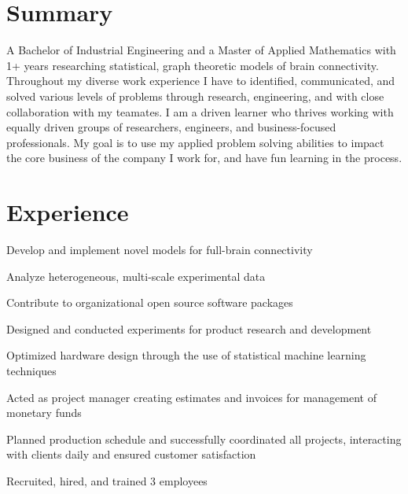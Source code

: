 \documentclass[]{deedy-resume-openfont}
\begin{document}
\hfill
\begin{minipage}[t]{0.63\textwidth}

\section{Summary}
A Bachelor of Industrial Engineering and a Master of Applied Mathematics with
1+ years researching statistical, graph theoretic models of brain connectivity.
Throughout my diverse work experience I have to identified, communicated,
and solved various levels of problems through research, engineering, and with close collaboration
with my teamates. I am a driven learner who thrives working with equally
driven groups of researchers, engineers, and business-focused professionals. My
goal is to use my applied problem solving abilities to impact the core business
of the company I work for, and have fun learning in the process.
\sectionsep




\section{Experience}
\vspace{\topsep}
\begin{tightemize}
\item {Develop and implement novel models for full-brain connectivity}
\item {Analyze heterogeneous, multi-scale experimental data}
\item {Contribute to organizational open source software packages}
\end{tightemize}
\sectionsep

\begin{tightemize}
\item {Designed and conducted experiments for product research and development}
\item {Optimized hardware design through the use of statistical machine learning techniques}
\end{tightemize}
\sectionsep

\begin{tightemize}
\item {Acted as project manager creating estimates and invoices for management of monetary funds}
\item {Planned production schedule and successfully coordinated all projects, interacting with clients daily and ensured customer satisfaction}
\item {Recruited, hired, and trained 3 employees}
\end{tightemize}
\sectionsep


\end{minipage}
\end{document}

